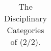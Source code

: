 {\begin{table}[p]
{\begin{tabular}{>{\raggedright\arraybackslash}p{3.5cm}>{\raggedright\arraybackslash}p{17cm}}
\bottomrule
\end{tabular}
}
\caption{The Disciplinary Categories of \benchmark (2/2).}
\label{tab:discipline_2}
\end{table}
}
